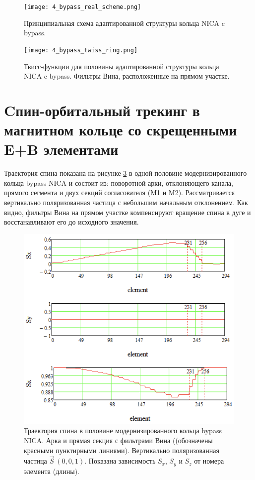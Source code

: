 \begin{figure}[!h]
  \centering
   \texttt{[image: 4\_bypass\_real\_scheme.png]}
   \caption{Принципиальная схема адаптированной структуры кольца NICA c bypass.}
   \label{fig:4_bypass_real_scheme}
\end{figure}

\begin{figure}[!h]
  \centering
   \texttt{[image: 4\_bypass\_twiss\_ring.png]}
   \caption{Твисс-функции для половины адаптированной структуры кольца NICA c bypass. Фильтры Вина, расположенные на прямом участке.}
   \label{fig:4_bypass_twiss_ring}
\end{figure}

\newpage
	
	\section{Cпин-орбитальный трекинг в магнитном кольце со скрещенными E+B элементами} \label{sec:EDM/Wien_filter_tracking}

\par Траектория спина показана на рисунке \ref{fig:4bypassspin} в одной половине модернизированного кольца bypass NICA и состоит из: поворотной арки, отклоняющего канала, прямого сегмента и двух секций согласователя (M1 и M2). Рассматривается вертикально поляризованная частица с небольшим начальным отклонением. Как видно, фильтры Вина на прямом участке компенсируют вращение спина в дуге и восстанавливают его до исходного значения.

\begin{figure}[!h]
	\centering
	\includegraphics[width=0.7\linewidth]{images/4_bypass_spin}
	\caption{Траектория спина в половине модернизированного кольца bypass NICA. Арка и прямая секция с фильтрами Вина ((обозначены красными пунктирными линиями). Вертикально поляризованная частица $\vec{S}~(0,0,1)$. Показана зависимость $S_{x}$, $S_{y}$ и $S_{z}$ от номера элемента (длины).}
	\label{fig:4bypassspin}
\end{figure}

